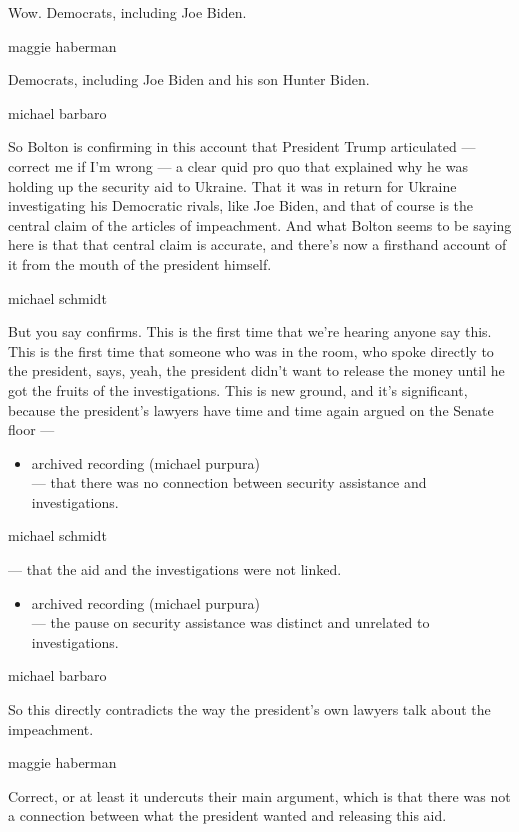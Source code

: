 Wow. Democrats, including Joe Biden.

maggie haberman

Democrats, including Joe Biden and his son Hunter Biden.

michael barbaro

So Bolton is confirming in this account that President Trump articulated
--- correct me if I'm wrong --- a clear quid pro quo that explained why
he was holding up the security aid to Ukraine. That it was in return for
Ukraine investigating his Democratic rivals, like Joe Biden, and that of
course is the central claim of the articles of impeachment. And what
Bolton seems to be saying here is that that central claim is accurate,
and there's now a firsthand account of it from the mouth of the
president himself.

michael schmidt

But you say confirms. This is the first time that we're hearing anyone
say this. This is the first time that someone who was in the room, who
spoke directly to the president, says, yeah, the president didn't want
to release the money until he got the fruits of the investigations. This
is new ground, and it's significant, because the president's lawyers
have time and time again argued on the Senate floor ---

\begin{itemize}
\tightlist
\item
  archived recording (michael purpura)\\
  --- that there was no connection between security assistance and
  investigations.
\end{itemize}

michael schmidt

--- that the aid and the investigations were not linked.

\begin{itemize}
\tightlist
\item
  archived recording (michael purpura)\\
  --- the pause on security assistance was distinct and unrelated to
  investigations.
\end{itemize}

michael barbaro

So this directly contradicts the way the president's own lawyers talk
about the impeachment.

maggie haberman

Correct, or at least it undercuts their main argument, which is that
there was not a connection between what the president wanted and
releasing this aid.

